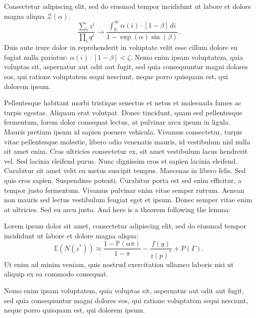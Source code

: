 \begin{lemma}
Consectetur adipiscing elit, sed do eiusmod tempor incididunt ut labore et dolore magna aliqua $\mathcal{Z}(\alpha)$. 
\begin{equation*}
\frac{\sum_i z^i}{\prod_i q^i} \to \frac{\int_{0}^{\infty} \alpha(i) \cdot [1-\beta]\,di}{1-\exp(\alpha)\sin(\beta)}.
\end{equation*}
Duis aute irure dolor in reprehenderit in voluptate velit esse cillum dolore eu fugiat nulla pariatur: $\alpha(i) \cdot [1-\beta] < \zeta$. Nemo enim ipsam voluptatem, quia voluptas sit, aspernatur aut odit aut fugit, sed quia consequuntur magni dolores eos, qui ratione voluptatem sequi nesciunt, neque porro quisquam est, qui dolorem ipsum.
\end{lemma}

Pellentesque habitant morbi tristique senectus et netus et malesuada fames ac turpis egestas. Aliquam erat volutpat. Donec tincidunt, quam sed pellentesque fermentum, lorem dolor consequat lectus, at pulvinar arcu ipsum in ligula. Mauris pretium ipsum id sapien posuere vehicula. Vivamus consectetur, turpis vitae pellentesque molestie, libero odio venenatis mauris, id vestibulum nisl nulla sit amet enim. Cras ultricies consectetur ex, sit amet vestibulum lacus hendrerit vel. Sed lacinia eleifend purus. Nunc dignissim eros et sapien lacinia eleifend. Curabitur sit amet velit eu metus suscipit tempus. Maecenas in libero felis. Sed quis eros sapien. Suspendisse potenti. Curabitur porta est sed enim efficitur, a tempor justo fermentum. Vivamus pulvinar enim vitae semper rutrum. Aenean non mauris sed lectus vestibulum feugiat eget et ipsum. Donec semper vitae enim at ultricies. Sed eu arcu justo. And here is a theorem following the lemma:
\begin{theorem} Lorem ipsum dolor sit amet, consectetur adipiscing elit, sed do eiusmod tempor incididunt ut labore et dolore magna aliqua:
\begin{equation*}
\mathbb{E}(N(z^*)) \approx \frac{1-\mathbb{P}(\alpha\pi)}{1-\pi}- \frac{f(y)}{z(p)^*} + P(\Gamma).
\end{equation*}
Ut enim ad minim veniam, quis nostrud exercitation ullamco laboris nisi ut aliquip ex ea commodo consequat.
\end{theorem}

Nemo enim ipsam voluptatem, quia voluptas sit, aspernatur aut odit aut fugit, sed quia consequuntur magni dolores eos, qui ratione voluptatem sequi nesciunt, neque porro quisquam est, qui dolorem ipsum.

